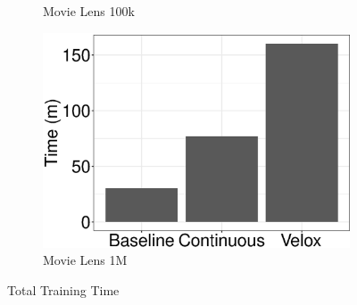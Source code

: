 \documentclass{vldb}
\begin{document}
\begin{figure}[h]
\begin{subfigure}[b]{0.2\textwidth}
	\caption{Movie Lens 100k}
	\label{fig:movie-lens-100k-times}
\end{subfigure}%
\begin{subfigure}[b]{0.2\textwidth}
  	\includegraphics[width=\linewidth, height=\linewidth,keepaspectratio]{../images/experiment-results/movie-lens-1M-times.eps}
	\caption{Movie Lens 1M}
	\label{fig:movie-lens-1M-times}
\end{subfigure}%
\vspace{2mm}
\caption{Total Training Time}
 \label{fig:local-training-time}
\end{figure}
\end{document}
